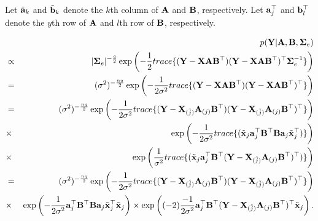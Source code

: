 \documentclass[]{book}
\begin{document}
Let \(\tilde{{\bf a}}_k\) and \(\tilde{{\bf b}}_k\) denote the \(k\)th column of \({\bf A}\) and \({\bf B}\), respectively. Let \({{\bf a}}_j^{{\top}}\) and \({{\bf b}}_l^{{\top}}\) denote the \(y\)th row of \({\bf A}\) and \(l\)th row of \({\bf B}\), respectively.

\begin{eqnarray*}
    &&p({\bf Y}|{\bf A},{\bf B},{\boldsymbol \Sigma}_e)\\
    &\propto& |{\boldsymbol \Sigma}_e|^{-\frac{q}{2}}\exp\left(-\frac{1}{2}trace\{
    ({\bf Y}-{\bf X}{\bf A}{\bf B}^{{\top}})({\bf Y}-{\bf X}{\bf A}{\bf B}^{{\top}})^{{\top}}{\boldsymbol \Sigma}_e^{-1}\}\right)\\
    &=& (\sigma^2)^{-\frac{nq}{2}}\exp\left(-\frac{1}{2\sigma^2}trace\{
    ({\bf Y}-{\bf X}{\bf A}{\bf B}^{{\top}})({\bf Y}-{\bf X}{\bf A}{\bf B}^{{\top}})^{{\top}}\}\right)\\
    &=&(\sigma^2)^{-\frac{nq}{2}}\exp\left(-\frac{1}{2\sigma^2}trace\{({\bf Y}-{\bf X}_{(\tilde{j})}{\bf A}_{(j)}{\bf B}^{{\top}})
    ({\bf Y}-{\bf X}_{(\tilde{j})}{\bf A}_{(j)}{\bf B}^{{\top}})^{{\top}}\}\right)\\
    &\times&\exp\left(-\frac{1}{2\sigma^2}trace\{(\tilde{{\bf x}}_j{\bf a}_j^{{\top}}{\bf B}^{{\top}}{\bf B}{\bf a}_j\tilde{{\bf x}}_j^{{\top}})
    \}\right)\\
    &\times&\exp\left(\frac{1}{\sigma^2}trace\{(\tilde{{\bf x}}_j{\bf a}_j^{{\top}}{\bf B}^{{\top}}({\bf Y}-{\bf X}_{(\tilde{j})}{\bf A}_{(j)}
    {\bf B}^{{\top}})^{{\top}})\}\right)\\
    &=&(\sigma^2)^{-\frac{nq}{2}}\exp\left(-\frac{1}{2\sigma^2}trace\{({\bf Y}-{\bf X}_{(\tilde{j})}{\bf A}_{(j)}{\bf B}^{{\top}})
    ({\bf Y}-{\bf X}_{(\tilde{j})}{\bf A}_{(j)}{\bf B}^{{\top}})^{{\top}}\}\right)\\
    &\times&\exp\left(-\frac{1}{2\sigma^2}{\bf a}_j^{{\top}}{\bf B}^{{\top}}{\bf B}{\bf a}_j\tilde{{\bf x}}_j^{{\top}}\tilde{{\bf x}}_j\right)
    \times \exp\left((-2)\frac{-1}{2\sigma^2}{\bf a}_j^{{\top}}{\bf B}^{{\top}}({\bf Y}-{\bf X}_{(\tilde{j})}{\bf A}_{(j)}
    {\bf B}^{{\top}})^{{\top}}\tilde{{\bf x}}_j\right).
\end{eqnarray*}
\end{document}
